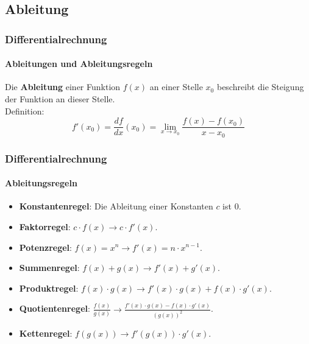 \documentclass{beamer}
\begin{document}
\subsection{Ableitung}
\begin{frame}
  \frametitle{Differentialrechnung}
  \framesubtitle{Ableitungen und Ableitungsregeln}


Die \textbf{Ableitung} einer Funktion $f(x)$ an einer Stelle $x_0$ beschreibt die Steigung der Funktion an dieser Stelle.\\

Definition: $$f'(x_0)=\frac{df}{dx}(x_0)=\lim_{x \to x_0} \frac{f(x)-f(x_0)}{x - x_0}$$
\begin{center}
\end{center}   
\end{frame}

\begin{frame}
  \frametitle{Differentialrechnung}
  \framesubtitle{Ableitungsregeln}

  \begin{itemize}
    \item \textbf{Konstantenregel}: Die Ableitung einer Konstanten $c$ ist $0$.
    \item \textbf{Faktorregel}: $c\cdot f(x) \longrightarrow c \cdot f'(x)$.
    \item \textbf{Potenzregel}: $f(x) = x^n \longrightarrow f'(x) = n \cdot x^{n-1}$.
    \item \textbf{Summenregel}: $f(x) + g(x) \longrightarrow f'(x) + g'(x)$.
    \item \textbf{Produktregel}: $f(x) \cdot g(x) \longrightarrow f'(x) \cdot g(x) + f(x) \cdot g'(x)$.
    \item \textbf{Quotientenregel}:  $\frac{f(x)}{g(x)} \longrightarrow \frac{f'(x) \cdot g(x) - f(x) \cdot g'(x)}{(g(x))^2}$.
    \item \textbf{Kettenregel}:  $f(g(x)) \longrightarrow f'(g(x)) \cdot g'(x)$.
  \end{itemize}
\end{frame}
\end{document}
